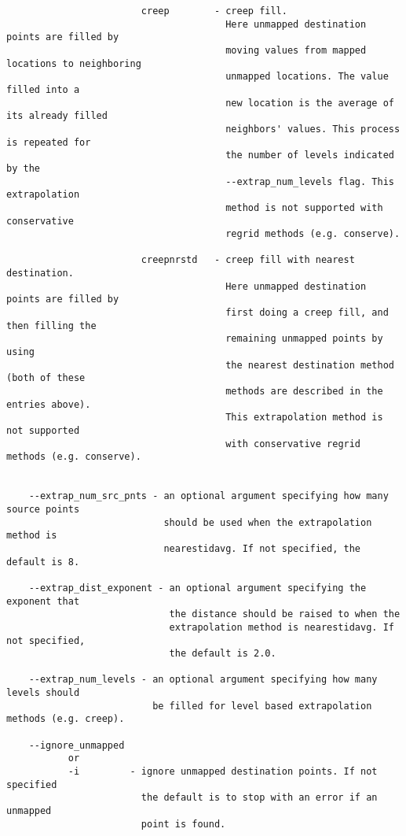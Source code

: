 \begin{verbatim}
                        creep        - creep fill. 
                                       Here unmapped destination points are filled by 
                                       moving values from mapped locations to neighboring 
                                       unmapped locations. The value filled into a 
                                       new location is the average of its already filled
                                       neighbors' values. This process is repeated for 
                                       the number of levels indicated by the 
                                       --extrap_num_levels flag. This extrapolation
                                       method is not supported with conservative 
                                       regrid methods (e.g. conserve).

                        creepnrstd   - creep fill with nearest destination.  
                                       Here unmapped destination points are filled by 
                                       first doing a creep fill, and then filling the 
                                       remaining unmapped points by using 
                                       the nearest destination method (both of these
                                       methods are described in the entries above). 
                                       This extrapolation method is not supported 
                                       with conservative regrid methods (e.g. conserve).
                                       

    --extrap_num_src_pnts - an optional argument specifying how many source points
                            should be used when the extrapolation method is 
                            nearestidavg. If not specified, the default is 8.

    --extrap_dist_exponent - an optional argument specifying the exponent that 
                             the distance should be raised to when the 
                             extrapolation method is nearestidavg. If not specified, 
                             the default is 2.0.

    --extrap_num_levels - an optional argument specifying how many levels should
                          be filled for level based extrapolation methods (e.g. creep).

    --ignore_unmapped
           or
           -i         - ignore unmapped destination points. If not specified
                        the default is to stop with an error if an unmapped
                        point is found.


\end{verbatim}

